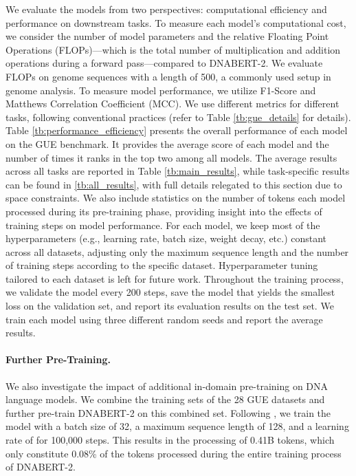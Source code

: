 \documentclass{article}
\begin{document}
We evaluate the models from two perspectives: computational efficiency and performance on downstream tasks. To measure each model's computational cost, we consider the number of model parameters and the relative Floating Point Operations (FLOPs)—which is the total number of multiplication and addition operations during a forward pass—compared to DNABERT-2. We evaluate FLOPs on genome sequences with a length of 500, a commonly used setup in genome analysis. To measure model performance, we utilize F1-Score and Matthews Correlation Coefficient (MCC). We use different metrics for different tasks, following conventional practices (refer to Table \ref{tb:gue_details} for details).
Table \ref{tb:performance_efficiency} presents the overall performance of each model on the GUE benchmark. It provides the average score of each model and the number of times it ranks in the top two among all models. The average results across all tasks are reported in Table \ref{tb:main_results}, while task-specific results can be found in \ref{tb:all_results}, with full details relegated to this section due to space constraints. We also include statistics on the number of tokens each model processed during its pre-training phase, providing insight into the effects of training steps on model performance.
For each model, we keep most of the hyperparameters (e.g., learning rate, batch size, weight decay, etc.) constant across all datasets, adjusting only the maximum sequence length and the number of training steps according to the specific dataset. Hyperparameter tuning tailored to each dataset is left for future work. Throughout the training process, we validate the model every 200 steps, save the model that yields the smallest loss on the validation set, and report its evaluation results on the test set. We train each model using three different random seeds and report the average results.
\paragraph{Further Pre-Training.} We also investigate the impact of additional in-domain pre-training on DNA language models. We combine the training sets of the 28 GUE datasets and further pre-train DNABERT-2 on this combined set. Following \citet{sun2020finetune}, we train the model with a batch size of 32, a maximum sequence length of 128, and a learning rate of  for 100,000 steps. This results in the processing of 0.41B tokens, which only constitute 0.08\% of the tokens processed during the entire training process of DNABERT-2.
\end{document}
